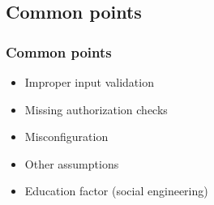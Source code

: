 \subsection{Common points}

\begin{frame}
\frametitle{Common points}
\begin{itemize}
\item<+-> Improper input validation
\item<+-> Missing authorization checks
\item<+-> Misconfiguration
\item<+-> Other assumptions
\item<+-> Education factor {\small (social engineering)}
\end{itemize}
\end{frame}

